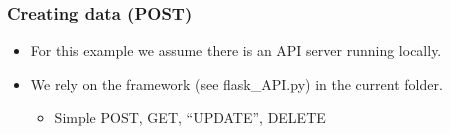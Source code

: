 \documentclass[letterpaper,10pt,english]{jupyterBook}
\begin{document}
\subsubsection{Creating data (POST)}
\label{\detokenize{2_Data_sources/APIs/REST:creating-data-post}}\begin{itemize}
\item {} 
\sphinxAtStartPar
For this example we assume there is an API server running locally.

\item {} 
\sphinxAtStartPar
We rely on the  framework (see flask\_API.py) in the current folder.
\begin{itemize}
\item {} 
\sphinxAtStartPar
Simple POST, GET, “UPDATE”, DELETE

\end{itemize}

\end{itemize}
\end{document}
